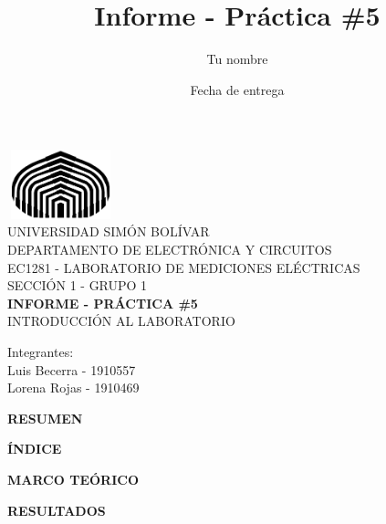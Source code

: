 \documentclass[12pt]{article}
\title{Informe - Práctica \#5}
\author{Tu nombre}
\date{Fecha de entrega}
\begin{document}
	\thispagestyle{empty}
	
	\begin{center}
		\includegraphics[width=3.1cm,height=2cm]{logo}\\
		UNIVERSIDAD SIMÓN BOLÍVAR\\
		DEPARTAMENTO DE ELECTRÓNICA Y CIRCUITOS\\
		EC1281 - LABORATORIO DE MEDICIONES ELÉCTRICAS\\
		SECCIÓN 1 - GRUPO 1\\
		
		\vspace{7cm}
		\textbf{\Large INFORME - PRÁCTICA \#5}\\
		INTRODUCCIÓN AL LABORATORIO\\
	\end{center}

	\begin{flushleft}
		\vspace{9cm}
		\hfill Integrantes:\\
		\hfill {\large Luis Becerra - 1910557}\\
		\hfill {\large Lorena Rojas - 1910469}\\
	\end{flushleft}

	\newpage
	
	
	\begin{center}
		\textbf{\large RESUMEN}\\
	\end{center}
	
	\newpage

	\begin{center}
		\textbf{\large ÍNDICE}\\
	\end{center}
	
	\newpage
	
	\begin{center}
		\textbf{\large MARCO TEÓRICO}\\
	\end{center}
	
	\newpage
	
	\begin{center}
		\textbf{\large RESULTADOS}\\
	\end{center}
\end{document}
